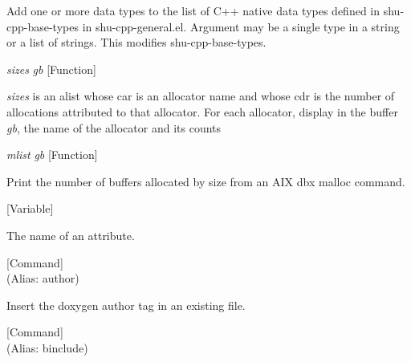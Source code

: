 \begin{doc-string}
Add one or more data types to the list of C++ native data types defined in shu-cpp-base-types
in shu-cpp-general.el.  Argument may be a single type in a string or a list of strings.
This modifies shu-cpp-base-types.
\end{doc-string}

\vspace{1em}
\noindent
{}
\usebox{\funcname}\emph{sizes} \emph{gb}
 \hfill [Function]

\begin{doc-string}
\emph{sizes} is an alist whose car is an allocator name and whose cdr is the number of
allocations attributed to that allocator.  For each allocator, display in the
buffer \emph{gb}, the name of the allocator and its counts
\end{doc-string}

\vspace{1em}
\noindent
{}
\usebox{\funcname}\emph{mlist} \emph{gb}
 \hfill [Function]

\begin{doc-string}
Print the number of buffers allocated by size from an AIX dbx malloc command.
\end{doc-string}

\vspace{1em}
\noindent
{}
\usebox{\funcname}
 \hfill [Variable]

\begin{doc-string}
The name of an attribute.
\end{doc-string}

\vspace{1em}
\noindent
{}
\usebox{\funcname}
 \hfill [Command]\\%
 (Alias: author)

\begin{doc-string}
Insert the doxygen author tag in an existing file.
\end{doc-string}

\vspace{1em}
\noindent
{}
\usebox{\funcname}
 \hfill [Command]\\%
 (Alias: binclude)

